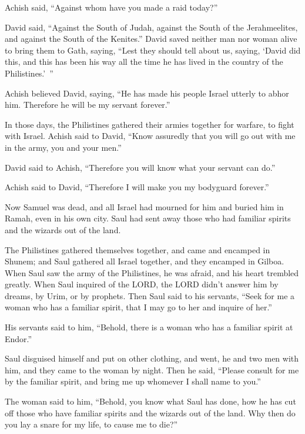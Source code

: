 \myverse{}Achish said, “Against whom have you made a raid today?”

David said, “Against the South of Judah, against the South of the Jerahmeelites, and against
the South of the Kenites.”
\myverse{}David saved neither man nor woman alive to bring them to Gath, saying, “Lest
they should tell about us, saying, ‘David did this, and this has been his way all the time he has lived
in the country of the Philistines.’ ”

\myverse{}Achish believed David, saying, “He has made his people Israel
utterly to abhor him. Therefore he will be my servant forever.”


\mychapter{} \myverse*{}In those days, the Philistines gathered their armies together
for warfare, to fight with Israel. Achish said to David, “Know assuredly that you will go out with me
in the army, you and your men.”

\myverse{}David said to Achish, “Therefore you will know what your servant
can do.”

Achish said to David, “Therefore I will make you my bodyguard forever.”

\myverse{}Now Samuel was dead, and all Israel had mourned for him and buried
him in Ramah, even in his own city. Saul had sent away those who had familiar spirits and the wizards
out of the land.

\myverse{}The Philistines gathered themselves together, and came and encamped
in Shunem; and Saul gathered all Israel together, and they encamped in Gilboa.
\myverse{}When Saul saw the army of the Philistines, he was afraid, and his heart trembled
greatly.
\myverse{}When Saul inquired of the LORD, the LORD didn’t answer him by dreams, by Urim,
or by prophets.
\myverse{}Then Saul said to his servants, “Seek for me a woman who has a familiar spirit,
that I may go to her and inquire of her.”

His servants said to him, “Behold, there is a woman who has a familiar spirit at Endor.”

\myverse{}Saul disguised himself and put on other clothing, and went, he
and two men with him, and they came to the woman by night. Then he said, “Please consult for me by the
familiar spirit, and bring me up whomever I shall name to you.”

\myverse{}The woman said to him, “Behold, you know what Saul has done, how
he has cut off those who have familiar spirits and the wizards out of the land. Why then do you lay a
snare for my life, to cause me to die?”

